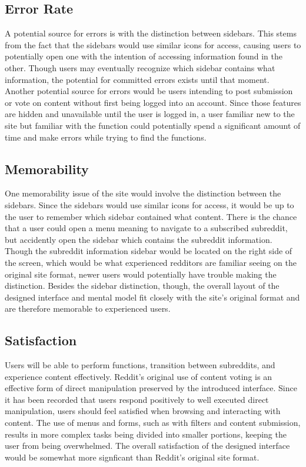 \documentclass{article}
\begin{document}
\subsection{Error Rate} A potential source for errors is with the distinction between sidebars. This stems from the fact that the sidebars would use similar icons for access, causing users to potentially open one with the intention of accessing information found in the other. Though users may eventually recognize which sidebar contains what information, the potential for committed errors exists until that moment. Another potential source for errors would be users intending to post submission or vote on content without first being logged into an account. Since those features are hidden and unavailable until the user is logged in, a user familiar new to the site but familiar with the function could potentially spend a significant amount of time and make errors while trying to find the functions.

\subsection{Memorability} One memorability issue of the site would involve the distinction between the sidebars. Since the sidebars would use similar icons for access, it would be up to the user to remember which sidebar contained what content. There is the chance that a user could open a menu meaning to navigate to a subscribed subreddit, but accidently open the sidebar which contains the subreddit information. Though the subreddit information sidebar would be located on the right side of the screen, which would be what experienced redditors are familiar seeing on the original site format, newer users would potentially have trouble making the distinction. Besides the sidebar distinction, though, the overall layout of the designed interface and mental model fit closely with the site's original format and are therefore memorable to experienced users.

\subsection{Satisfaction} Users will be able to perform functions, transition between subreddits, and experience content effectively. Reddit's original use of content voting is an effective form of direct manipulation preserved by the introduced interface. Since it has been recorded that users respond positively to well executed direct manipulation, users should feel satisfied when browsing and interacting with content. The use of menus and forms, such as with filters and content submission, results in more complex tasks being divided into smaller portions, keeping the user from being overwhelmed. The overall satisfaction of the designed interface would be somewhat more signficant than Reddit's original site format.
\end{document}
